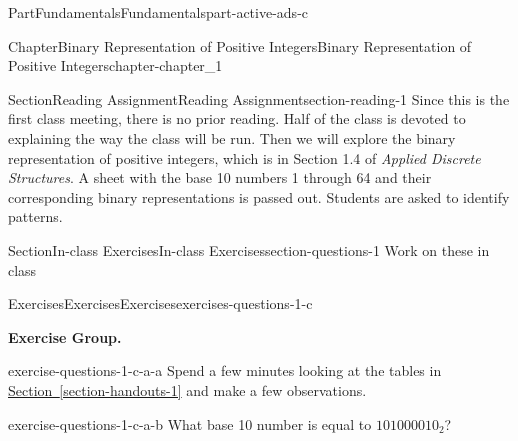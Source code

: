 \documentclass[oneside,10pt,]{book}
\newcommand{\xreffont}{\relax}
\numberwithin{equation}{section}
\begin{document}
\begin{partptx}{Part}{Fundamentals}{}{Fundamentals}{}{}{part-active-ads-c}
\renewcommand*{\partname}{Part}
%
\typeout{************************************************}
\typeout{************************************************}
%
\begin{chapterptx}{Chapter}{Binary Representation of Positive Integers}{}{Binary Representation of Positive Integers}{}{}{chapter-chapter_1}
\renewcommand*{\chaptername}{Chapter}
%
%
%
\typeout{************************************************}
\typeout{************************************************}
%
\begin{sectionptx}{Section}{Reading Assignment}{}{Reading Assignment}{}{}{section-reading-1}
Since this is the first class meeting, there is no prior reading.  Half of the class is devoted to explaining the way the class will be run.  Then we will explore the binary representation of positive integers, which is in Section 1.4 of \emph{Applied Discrete Structures}.  A sheet with the base 10 numbers 1 through 64 and their corresponding binary representations is passed out.  Students are asked to identify patterns.%
\end{sectionptx}
%
%
\typeout{************************************************}
\typeout{************************************************}
%
\begin{sectionptx}{Section}{In-class Exercises}{}{In-class Exercises}{}{}{section-questions-1}
Work on these in class%
%
%
\typeout{************************************************}
\typeout{************************************************}
%
\begin{exercises-subsection-numberless}{Exercises}{Exercises}{}{Exercises}{}{}{exercises-questions-1-c}
\par\medskip\noindent%
\textbf{Exercise Group.}\space\space%
\begin{exercisegroup}
\begin{divisionexerciseeg}{1}{}{}{exercise-questions-1-c-a-a}%
Spend a few minutes looking at the tables in \hyperref[section-handouts-1]{Section~{\xreffont\ref{section-handouts-1}}} and make a few observations.%
\end{divisionexerciseeg}%
\begin{divisionexerciseeg}{2}{}{}{exercise-questions-1-c-a-b}%
What base 10 number is equal to \(101000010_2\)?%

\end{divisionexerciseeg}
\end{exercisegroup}
\end{exercises-subsection-numberless}
\end{sectionptx}
\end{chapterptx}
\end{partptx}
\end{document}
